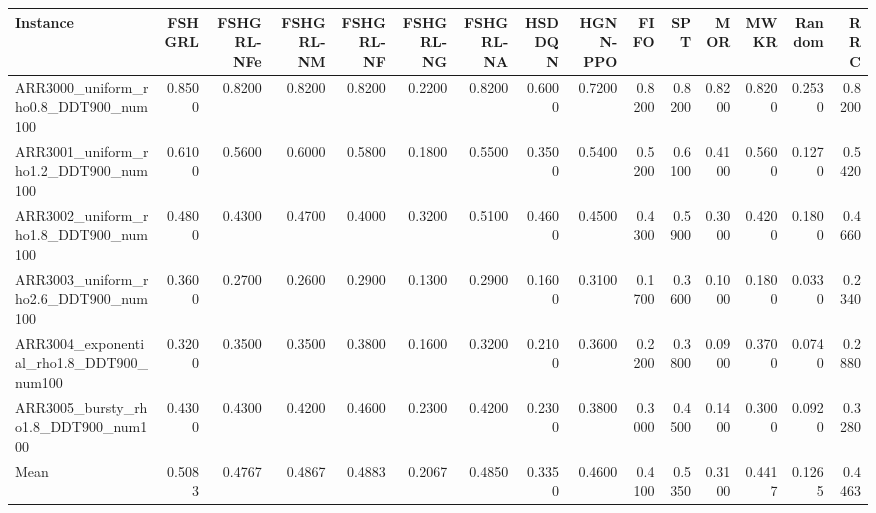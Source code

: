 \begin{tabular}{lrrrrrrrrrrrrrr}
\toprule
Instance & FSHGRL & FSHGRL-NFe & FSHGRL-NM & FSHGRL-NF & FSHGRL-NG & FSHGRL-NA & HSDDQN & HGNN-PPO & FIFO & SPT & MOR & MWKR & Random & RRC \\
\midrule
ARR3000\_uniform\_rho0.8\_DDT900\_num100 & 0.8500 & 0.8200 & 0.8200 & 0.8200 & 0.2200 & 0.8200 & 0.6000 & 0.7200 & 0.8200 & 0.8200 & 0.8200 & 0.8200 & 0.2530 & 0.8200 \\
ARR3001\_uniform\_rho1.2\_DDT900\_num100 & 0.6100 & 0.5600 & 0.6000 & 0.5800 & 0.1800 & 0.5500 & 0.3500 & 0.5400 & 0.5200 & 0.6100 & 0.4100 & 0.5600 & 0.1270 & 0.5420 \\
ARR3002\_uniform\_rho1.8\_DDT900\_num100 & 0.4800 & 0.4300 & 0.4700 & 0.4000 & 0.3200 & 0.5100 & 0.4600 & 0.4500 & 0.4300 & 0.5900 & 0.3000 & 0.4200 & 0.1800 & 0.4660 \\
ARR3003\_uniform\_rho2.6\_DDT900\_num100 & 0.3600 & 0.2700 & 0.2600 & 0.2900 & 0.1300 & 0.2900 & 0.1600 & 0.3100 & 0.1700 & 0.3600 & 0.1000 & 0.1800 & 0.0330 & 0.2340 \\
ARR3004\_exponential\_rho1.8\_DDT900\_num100 & 0.3200 & 0.3500 & 0.3500 & 0.3800 & 0.1600 & 0.3200 & 0.2100 & 0.3600 & 0.2200 & 0.3800 & 0.0900 & 0.3700 & 0.0740 & 0.2880 \\
ARR3005\_bursty\_rho1.8\_DDT900\_num100 & 0.4300 & 0.4300 & 0.4200 & 0.4600 & 0.2300 & 0.4200 & 0.2300 & 0.3800 & 0.3000 & 0.4500 & 0.1400 & 0.3000 & 0.0920 & 0.3280 \\
Mean & 0.5083 & 0.4767 & 0.4867 & 0.4883 & 0.2067 & 0.4850 & 0.3350 & 0.4600 & 0.4100 & 0.5350 & 0.3100 & 0.4417 & 0.1265 & 0.4463 \\
\bottomrule
\end{tabular}
